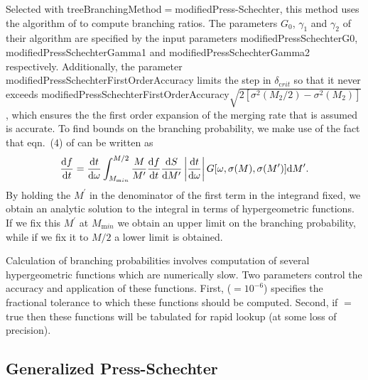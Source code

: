 Selected with {\normalfont \ttfamily treeBranchingMethod}$=${\normalfont \ttfamily modifiedPress-Schechter}, this method uses the algorithm of \cite{parkinson_generating_2008} to compute branching ratios. The parameters $G_0$, $\gamma_1$ and $\gamma_2$ of their algorithm are specified by the input parameters {\normalfont \ttfamily modifiedPressSchechterG0}, {\normalfont \ttfamily modifiedPressSchechterGamma1} and {\normalfont \ttfamily modifiedPressSchechterGamma2} respectively. Additionally, the parameter {\normalfont \ttfamily modifiedPressSchechterFirstOrderAccuracy} limits the step in $\delta_{\mathrm crit}$ so that it never exceeds {\normalfont \ttfamily modifiedPressSchechterFirstOrderAccuracy}$\sqrt{2[\sigma^2(M_2/2)-\sigma^2(M_2)]}$, which ensures the the first order expansion of the merging rate that is assumed is accurate. To find bounds on the branching probability, we make use of the fact that eqn.~(4) of \cite{parkinson_generating_2008} can be written as
\begin{equation}
 {\d f \over \d t} = {{\mathrm d} t \over {\mathrm d}\omega} \int_{M_{\mathrm min}}^{M/2} {M \over M^\prime} {\d f \over \d t} {\d S \over \d M^\prime} \left| {\d t \over \d \omega}\right| G[\omega,\sigma(M),\sigma(M^\prime)] \d M^\prime.
\end{equation}
By holding the $M^\prime$ in the denominator of the first term in the integrand fixed, we obtain an analytic solution to the integral in terms of hypergeometric functions. If we fix this $M^\prime$ at $M_{\mathrm min}$ we obtain an upper limit on the branching probability, while if we fix it to $M/2$ a lower limit is obtained.

Calculation of branching probabilities involves computation of several hypergeometric functions which are numerically slow. Two parameters control the accuracy and application of these functions. First, {\normalfont \ttfamily [modifiedPressSchechterHypergeometricPrecision]}($=10^{-6}$) specifies the fractional tolerance to which these functions should be computed. Second, if {\normalfont \ttfamily [modifiedPressSchechterTabulateHypergeometricFactors]}$=${\normalfont \ttfamily true} then these functions will be tabulated for rapid lookup (at some loss of precision).

\subsection{Generalized Press-Schechter}

